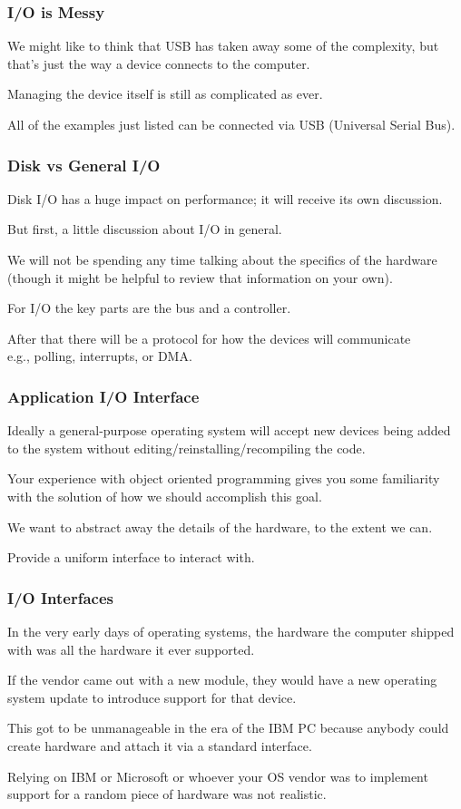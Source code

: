 \begin{frame}
\frametitle{I/O is Messy}

We might like to think that USB has taken away some of the complexity, but that's just the way a device connects to the computer. 

Managing the device itself is still as complicated as ever. 

All of the examples just listed can be connected via USB (Universal Serial Bus). 


\end{frame}

\begin{frame}
\frametitle{Disk vs General I/O}

Disk I/O has a huge impact on performance; it will receive its own discussion. 

But first, a little discussion about I/O in general.

We will not be spending any time talking about the specifics of the hardware (though it might be helpful to review that information on your own). 

For I/O the key parts are the bus and a controller. 

After that there will be a protocol for how the devices will communicate\\
\quad e.g., polling, interrupts, or DMA.

\end{frame}



\begin{frame}
\frametitle{Application I/O Interface}

Ideally a general-purpose operating system will accept new devices being added to the system without editing/reinstalling/recompiling the code. 

Your experience with object oriented programming gives you some familiarity with the solution of how we should accomplish this goal. 

We want to abstract away the details of the hardware, to the extent we can. 

Provide a uniform \alert{interface} to interact with. 

\end{frame}

\begin{frame}
\frametitle{I/O Interfaces}

In the very early days of operating systems, the hardware the computer shipped with was all the hardware it ever supported. 

If the vendor came out with a new module, they would have a new operating system update to introduce support for that device. 

This got to be unmanageable in the era of the IBM PC because anybody could create hardware and attach it via a standard interface. 

Relying on IBM or Microsoft or whoever your OS vendor was to implement support for a random piece of hardware was not realistic.


\end{frame}


